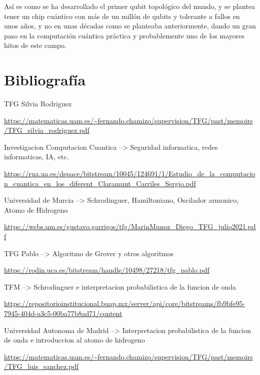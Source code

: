 \documentclass{article}
\numberwithin{equation}{section} %
\begin{document}
    Así es como se ha desarrollado el primer qubit topológico del mundo, y se plantea tener un chip cuántico con más de un millón de qubits y tolerante a fallos en unos años, y no en unas décadas como se planteaba anteriormente, dando un gran paso en la computación cuántica práctica y probablemente uno de los mayores hitos de este campo.





    \newpage
    \thispagestyle{empty}
    \mbox{}
    \newpage

    \section{Bibliografía}

        \vspace{5mm}

        TFG Silvia Rodriguez\par
        \url{https://matematicas.uam.es/~fernando.chamizo/supervision/TFG/past/memoirs/TFG_silvia_rodriguez.pdf}
        \vspace{2mm}

        Investigacion Computacion Cuantica --> Seguridad informatica, redes informaticas, IA, etc.\par
        \url{https://rua.ua.es/dspace/bitstream/10045/124691/1/Estudio_de_la_computacion_cuantica_en_los_diferent_Claramunt_Carriles_Sergio.pdf}
        \vspace{2mm}

        Universidad de Murcia --> Schrodinguer, Hamiltoniano, Oscilador armonico, Atomo de Hidrogeno\par
        \url{https://webs.um.es/gustavo.garrigos/tfg/MarinMunoz_Diego_TFG_julio2021.pdf}
        \vspace{2mm}

        TFG Pablo --> Algoritmo de Grover y otros algoritmos\par
        \url{https://rodin.uca.es/bitstream/handle/10498/27218/tfg_pablo.pdf}
        \vspace{2mm}

        TFM --> Schrodinguer e interpretacion probabilistica de la funcion de onda\par
        \url{https://repositorioinstitucional.buap.mx/server/api/core/bitstreams/fb9bfe95-7945-404d-a3c5-00ba77b8ad71/content}
        \vspace{2mm}

        Universidad Autonoma de Madrid --> Interpretacion probabilistica de la funcion de onda e introduccion al atomo de hidrogeno\par
        \url{https://matematicas.uam.es/~fernando.chamizo/supervision/TFG/past/memoirs/TFG_luis_sanchez.pdf}
        \vspace{2mm}
\end{document}
